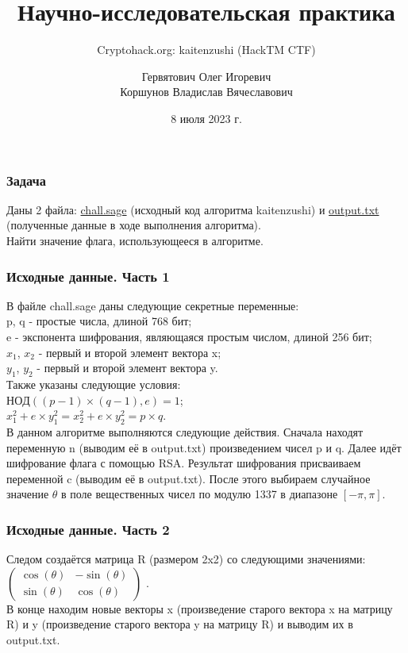 \documentclass[t]{beamer}
\title{Научно-исследовательская практика}
\subtitle{Cryptohack.org: kaitenzushi (HackTM CTF)}
\author[]{Гервятович Олег Игоревич \\ Коршунов Владислав Вячеславович}
\date{8 июля 2023 г.}
\institute[БФУ им. И. Канта]{Институт физико-математических наук и информационных технологий БФУ им. И. Канта}
\begin{document}
\frame[plain]{\titlepage}	%
 
\begin{frame}[c]
	\frametitle{Задача} 
		 \begin{block}{}
		     {Даны 2 файла: \href{https://cryptohack.org/static/challenges/chall_da028129113081fdccaf0e228c74c3fd.sage}   
          {chall.sage} (исходный код алгоритма kaitenzushi) и \href{https://cryptohack.org/static/challenges/output_94fa49958535125cc5ea05f5960fc001.txt}   
          {output.txt} (полученные данные в ходе выполнения алгоритма). \\ Найти значение флага, использующееся в алгоритме.}
		 \end{block}
\end{frame}

\begin{frame}[c]
	\frametitle{Исходные данные. Часть 1} 
		 \begin{block}{}
		     {В файле chall.sage даны следующие секретные переменные: \\ p, q - простые числа, длиной 768 бит; \\ e - экспонента шифрования, являющаяся простым числом, длиной 256 бит; \\ \(x_1\), \(x_2\) - первый и второй элемент вектора x; \\ \(y_1\), \(y_2\) - первый и второй элемент вектора y. \\ Также указаны следующие условия: \\ \(НОД((p-1) \times (q-1), e)=1\); \\ \(x_1^2+e \times y_1^2 = x_2^2+e \times y_2^2 = p \times q\). \\ В данном алгоритме выполняются следующие действия. Сначала находят переменную n (выводим её в output.txt) произведением чисел p и q. Далее идёт шифрование флага с помощью RSA. Результат шифрования присваиваем переменной c (выводим её в output.txt). После этого выбираем случайное значение \(\theta\) в поле вещественных чисел по модулю 1337 в диапазоне \([-\pi, \pi]\).}
          \end{block}
\end{frame}

\begin{frame}[c]
	\frametitle{Исходные данные. Часть 2} 
		 \begin{block}{}
		     {Следом создаётся матрица R (размером 2x2) со следующими значениями:}
              $\begin{pmatrix}
               \cos(\theta) & -\sin(\theta) \\
               \sin(\theta) & \cos(\theta)
              \end{pmatrix}$
              {. \\ В конце находим новые векторы x (произведение старого вектора x на матрицу R) и y (произведение старого вектора y на матрицу R) и выводим их в output.txt.}
	     \end{block}
\end{frame}
\end{document}
